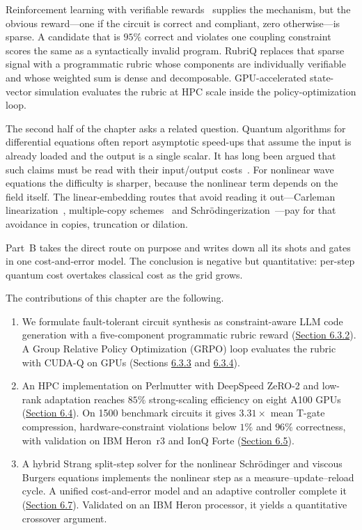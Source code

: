\documentclass{report}
\theoremstyle{plain}
\theoremstyle{definition}
\theoremstyle{remark}
\begin{document}
Reinforcement learning with verifiable rewards~\cite{deepseek2025r1} supplies the mechanism, but the obvious reward---one if the circuit is correct and compliant, zero otherwise---is sparse. A candidate that is $95\%$ correct and violates one coupling constraint scores the same as a syntactically invalid program. RubriQ replaces that sparse signal with a programmatic rubric whose components are individually verifiable and whose weighted sum is dense and decomposable. GPU-accelerated state-vector simulation evaluates the rubric at HPC scale inside the policy-optimization loop.

The second half of the chapter asks a related question. Quantum algorithms for differential equations often report asymptotic speed-ups that assume the input is already loaded and the output is a single scalar. It has long been argued that such claims must be read with their input/output costs~\cite{aaronson2015fineprint}. For nonlinear wave equations the difficulty is sharper, because the nonlinear term depends on the field itself. The linear-embedding routes that avoid reading it out---Carleman linearization~\cite{liu2021carleman}, multiple-copy schemes~\cite{lloyd2020nonlinear} and Schr\"odingerization~\cite{jin2024schrodingerization}---pay for that avoidance in copies, truncation or dilation.

Part~B takes the direct route on purpose and writes down all its shots and gates in one cost-and-error model. The conclusion is negative but quantitative: per-step quantum cost overtakes classical cost as the grid grows.

The contributions of this chapter are the following.
\begin{enumerate}
  \item We formulate fault-tolerant circuit synthesis as constraint-aware LLM code generation with a five-component programmatic rubric reward (\hyperref[sec:syn:rubric]{Section 6.3.2}). A Group Relative Policy Optimization (GRPO) loop evaluates the rubric with CUDA-Q on GPUs (Sections \hyperref[sec:syn:grpo]{6.3.3} and \hyperref[sec:syn:loop]{6.3.4}).
  \item An HPC implementation on Perlmutter with DeepSpeed ZeRO-2 and low-rank adaptation reaches $85\%$ strong-scaling efficiency on eight A100 GPUs (\hyperref[sec:syn:impl]{Section 6.4}). On 1500 benchmark circuits it gives $3.31\times$ mean T-gate compression, hardware-constraint violations below $1\%$ and $96\%$ correctness, with validation on IBM Heron~r3 and IonQ Forte (\hyperref[sec:syn:results]{Section 6.5}).
  \item A hybrid Strang split-step solver for the nonlinear Schr\"odinger and viscous Burgers equations implements the nonlinear step as a measure--update--reload cycle. A unified cost-and-error model and an adaptive controller complete it (\hyperref[sec:syn:waves]{Section 6.7}). Validated on an IBM Heron processor, it yields a quantitative crossover argument.
\end{enumerate}
\end{document}
